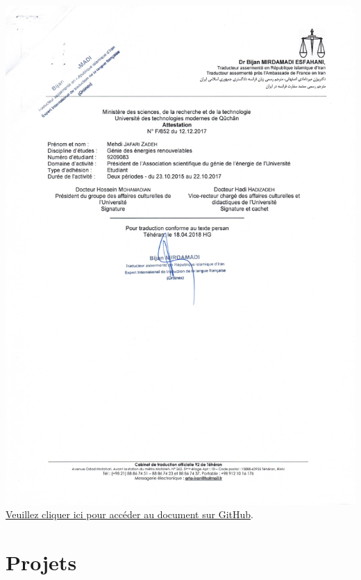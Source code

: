 \documentclass{article}
\begin{document}
        \begin{center}
            \includegraphics[width=\textwidth,height=\textheight,keepaspectratio]{../Document/Work Experience/Director of the Energy Engineering Association/12-12-2017 attestation 02.jpg}
            \footnotesize
             \href{https://github.com/jafarizadeh/CV---lettre/tree/079f60796b41475881d7ba4a70abc3254d3dd466/Document/Work%20Experience/Director%20of%20the%20Energy%20Engineering%20Association}{Veuillez cliquer ici pour accéder au document sur GitHub}.
        \end{center}



    \section{Projets}
\end{document}
